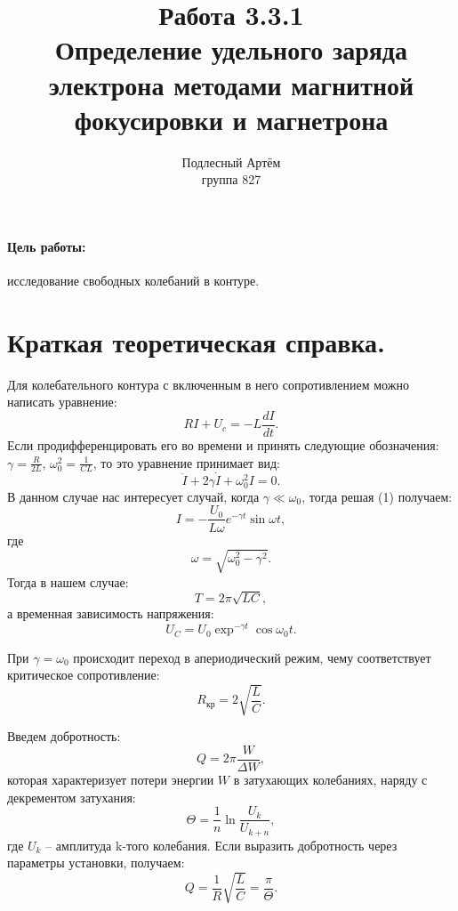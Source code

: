\documentclass[a4paper, 14pt]{extarticle}%
\author{Подлесный Артём \\ группа 827}
\title{Работа 3.3.1 \\ Определение удельного заряда электрона методами магнитной фокусировки и магнетрона }
\begin{document}
\maketitle

\paragraph*{Цель работы:}исследование свободных колебаний в контуре.

\section*{Краткая теоретическая справка.}

Для колебательного контура с включенным в него сопротивлением можно написать уравнение:
\[RI+U_c=-L\frac{dI}{dt}.\]
Если продифференцировать его во времени и принять следующие обозначения: $\gamma = \frac{R}{2L}$, $\omega^2_0=\frac{1}{CL}$, то это уравнение принимает вид:
\begin{equation}
\ddot{I}+2\gamma\dot{I}+\omega^2_0I=0.
\end{equation}
В данном случае нас интересует случай, когда $\gamma\ll\omega_0$, тогда решая (1) получаем:
\begin{equation}
I= - \frac{U_0}{L\omega}e^{-\gamma t}\sin\omega t,
\end{equation}
где 
\[\omega = \sqrt{\omega^2_0 - \gamma^2}.\]
Тогда в нашем случае:
\begin{equation}
T = 2\pi\sqrt{LC},
\end{equation}
а временная зависимость напряжения:
\[U_C = U_0\exp^{-\gamma t}\cos\omega_0t.\]

При $\gamma = \omega_0$ происходит переход в апериодический режим, чему соответствует критическое сопротивление:
\begin{equation}
R_{\text{кр}} = 2\sqrt{\frac{L}{C}}.
\end{equation}

Введем добротность:
\[Q = 2\pi\frac{W}{\Delta W},\]
которая характеризует потери энергии $W$ в затухающих колебаниях, наряду с декрементом затухания:
\begin{equation}
\Theta = \frac{1}{n} \ln\dfrac{U_k}{U_{k+n}},
\end{equation}
где $U_k$ -- амплитуда k-того колебания. Если выразить добротность через параметры установки, получаем:
\begin{equation}
Q=\frac{1}{R}\sqrt{\frac{L}{C}} = \frac{\pi}{\Theta}.
\end{equation}
\end{document}
